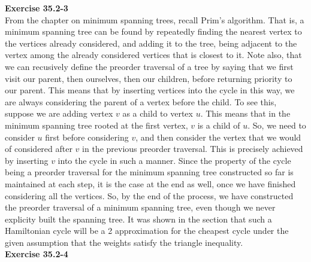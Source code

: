 \documentclass{article}
\begin{document}
\noindent\textbf{Exercise 35.2-3}\\

From the chapter on minimum spanning trees, recall Prim's algorithm. That is, a minimum spanning tree can be found by repeatedly finding the nearest vertex to the vertices already considered, and adding it to the tree, being adjacent to the vertex among the already considered vertices that is closest to it. Note also, that we can recusively define the preorder traversal of a tree by saying that we first visit our parent, then ourselves, then our children, before returning priority to our parent. This means that by inserting vertices into the cycle in this way, we are always considering the parent of a vertex before the child. To see this, suppose we are adding vertex $v$ as a child to vertex $u$. This means that in the minimum spanning tree rooted at the first vertex, $v$ is a child of $u$. So, we need to consider $u$ first before considering $v$, and then consider the vertex that we would of considered after $v$ in the previous preorder traversal. This is precisely achieved by inserting $v$ into the cycle in such a manner. Since the property of the cycle being a preorder traversal for the minimum spanning tree constructed so far is maintained at each step, it is the case at the end as well, once we have finished considering all the vertices.  So, by the end of the process, we have constructed the preorder traversal of a minimum spanning tree, even though we never explicity built the spanning tree. It was shown in the section that such a Hamiltonian cycle will be a 2 approximation for the cheapest cycle under the given assumption that the weights satisfy the triangle inequality.\\

\noindent\textbf{Exercise 35.2-4}\\
\end{document}
